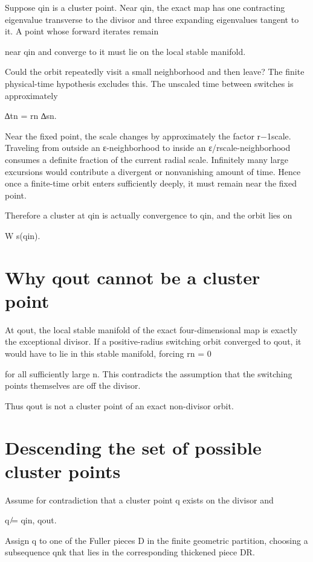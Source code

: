 Suppose qin is a cluster point. Near qin, the exact map has one contracting eigenvalue transverse to the divisor and three expanding eigenvalues tangent to it. A point whose forward iterates remain


near qin and converge to it must lie on the local stable manifold.


Could the orbit repeatedly visit a small neighborhood and then leave? The finite physical-time hypothesis excludes this. The unscaled time between switches is approximately


∆tn = rn ∆sn.


Near the fixed point, the scale changes by approximately the factor r−1scale. Traveling from outside an ε-neighborhood to inside an ε/rscale-neighborhood consumes a definite fraction of the current radial scale. Infinitely many large excursions would contribute a divergent or nonvanishing amount of time. Hence once a finite-time orbit enters sufficiently deeply, it must remain near the fixed point.


Therefore a cluster at qin is actually convergence to qin, and the orbit lies on


W s(qin).


\section{Why qout cannot be a cluster point}

At qout, the local stable manifold of the exact four-dimensional map is exactly the exceptional divisor. If a positive-radius switching orbit converged to qout, it would have to lie in this stable manifold, forcing rn = 0


for all sufficiently large n. This contradicts the assumption that the switching points themselves are off the divisor.


Thus qout is not a cluster point of an exact non-divisor orbit.


\section{Descending the set of possible cluster points}

Assume for contradiction that a cluster point q exists on the divisor and


q ̸= qin, qout.


Assign q to one of the Fuller pieces D in the finite geometric partition, choosing a subsequence qnk that lies in the corresponding thickened piece DR.


